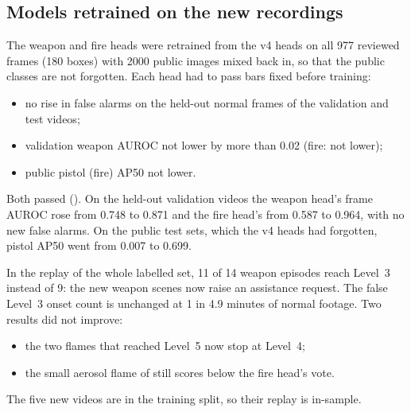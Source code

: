 \subsection{Models retrained on the new recordings}
The weapon and fire heads were retrained from the v4 heads on all 977 reviewed frames (180 boxes) with 2000 public images mixed back in, so that the public classes are not forgotten. Each head had to pass bars fixed before training:
\begin{itemize}
\item no rise in false alarms on the held-out normal frames of the validation and test videos;
\item validation weapon AUROC not lower by more than 0.02 (fire: not lower);
\item public pistol (fire) AP50 not lower.
\end{itemize}
Both passed (). On the held-out validation videos the weapon head's frame AUROC rose from 0.748 to 0.871 and the fire head's from 0.587 to 0.964, with no new false alarms. On the public test sets, which the v4 heads had forgotten, pistol AP50 went from 0.007 to 0.699.

In the replay of the whole labelled set, 11 of 14 weapon episodes reach Level~3 instead of 9: the new weapon scenes now raise an assistance request. The false Level~3 onset count is unchanged at 1 in 4.9 minutes of normal footage. Two results did not improve:
\begin{itemize}
\item the two flames that reached Level~5 now stop at Level~4;
\item the small aerosol flame of  still scores below the fire head's vote.
\end{itemize}
The five new videos are in the training split, so their replay is in-sample.

